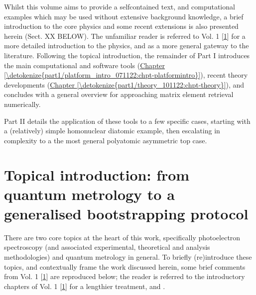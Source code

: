 \documentclass[letterpaper,table,10pt,english]{jupyterBook}
\begin{document}
\sphinxAtStartPar
Whilst this volume aims to provide a self\sphinxhyphen{}contained text, and computational examples which may be used without extensive background knowledge, a brief introduction to the core physics and some recent extensions is also presented herein (Sect. XX BELOW). The unfamiliar reader is referred to  Vol. 1 {[}\hyperlink{cite.backmatter/bibliography:id613}{1}{]} for a more detailed introduction to the physics, and as a more general gateway to the literature. Following the topical introduction, the remainder of Part I introduces the main computational and software tools (\hyperref[\detokenize{part1/platform_intro_071122:chpt-platformintro}]{Chapter \ref{\detokenize{part1/platform_intro_071122:chpt-platformintro}}}), recent theory developments (\hyperref[\detokenize{part1/theory_101122:chpt-theory}]{Chapter \ref{\detokenize{part1/theory_101122:chpt-theory}}}), and concludes with a general overview for approaching matrix element retrieval numerically.

\sphinxAtStartPar
Part II details the application of these tools to a few specific cases, starting with a (relatively) simple homonuclear diatomic example, then escalating in complexity to a the most general polyatomic asymmetric top case.


\section{Topical introduction: from quantum metrology to a generalised bootstrapping protocol}
\label{\detokenize{part1/main_intro_051122:topical-introduction-from-quantum-metrology-to-a-generalised-bootstrapping-protocol}}\label{\detokenize{part1/main_intro_051122:sec-topical-intro}}
\sphinxAtStartPar
There are two core topics at the heart of this work, specifically photoelectron spectroscopy (and associated experimental, theoretical and analysis methodologies) and quantum metrology in general. To briefly (re)introduce these topics, and contextually frame the work discussed herein, some brief comments from  Vol. 1 {[}\hyperlink{cite.backmatter/bibliography:id613}{1}{]} are reproduced below; the reader is referred to the introductory chapters of  Vol. 1 {[}\hyperlink{cite.backmatter/bibliography:id613}{1}{]} for a lengthier treatment, and .
\end{document}
